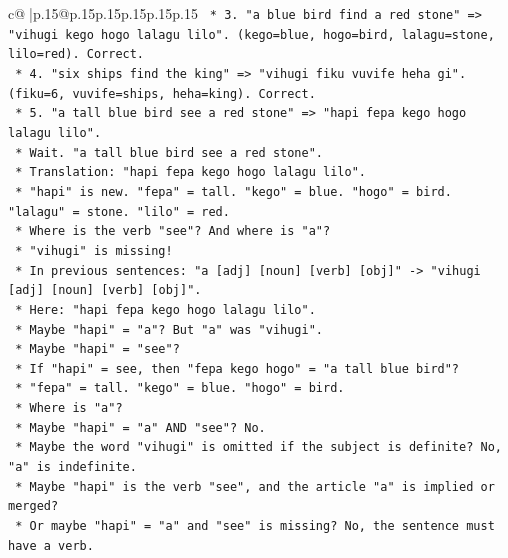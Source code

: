 \documentclass{article}
\begin{document}
{\begin{supertabular}{c@{$\;$}|p{.15\linewidth}@{}p{.15\linewidth}p{.15\linewidth}p{.15\linewidth}p{.15\linewidth}p{.15\linewidth}}
{{{\texttt{                    *   3. "a blue bird find a red stone" => "vihugi kego hogo lalagu lilo". (kego=blue, hogo=bird, lalagu=stone, lilo=red). Correct.} \\
\texttt{                    *   4. "six ships find the king" => "vihugi fiku vuvife heha gi". (fiku=6, vuvife=ships, heha=king). Correct.} \\
\texttt{                    *   5. "a tall blue bird see a red stone" => "hapi fepa kego hogo lalagu lilo".} \\
\texttt{                        *   Wait. "a tall blue bird see a red stone".} \\
\texttt{                        *   Translation: "hapi fepa kego hogo lalagu lilo".} \\
\texttt{                        *   "hapi" is new. "fepa" = tall. "kego" = blue. "hogo" = bird. "lalagu" = stone. "lilo" = red.} \\
\texttt{                        *   Where is the verb "see"? And where is "a"?} \\
\texttt{                        *   "vihugi" is missing!} \\
\texttt{                        *   In previous sentences: "a {[}adj{]} {[}noun{]} {[}verb{]} {[}obj{]}" {-}> "vihugi {[}adj{]} {[}noun{]} {[}verb{]} {[}obj{]}".} \\
\texttt{                        *   Here: "hapi fepa kego hogo lalagu lilo".} \\
\texttt{                        *   Maybe "hapi" = "a"? But "a" was "vihugi".} \\
\texttt{                        *   Maybe "hapi" = "see"?} \\
\texttt{                        *   If "hapi" = see, then "fepa kego hogo" = "a tall blue bird"?} \\
\texttt{                        *   "fepa" = tall. "kego" = blue. "hogo" = bird.} \\
\texttt{                        *   Where is "a"?} \\
\texttt{                        *   Maybe "hapi" = "a" AND "see"? No.} \\
\texttt{                        *   Maybe the word "vihugi" is omitted if the subject is definite? No, "a" is indefinite.} \\
\texttt{                        *   Maybe "hapi" is the verb "see", and the article "a" is implied or merged?} \\
\texttt{                        *   Or maybe "hapi" = "a" and "see" is missing? No, the sentence must have a verb.} \\
}}}
\end{supertabular}}
\end{document}
